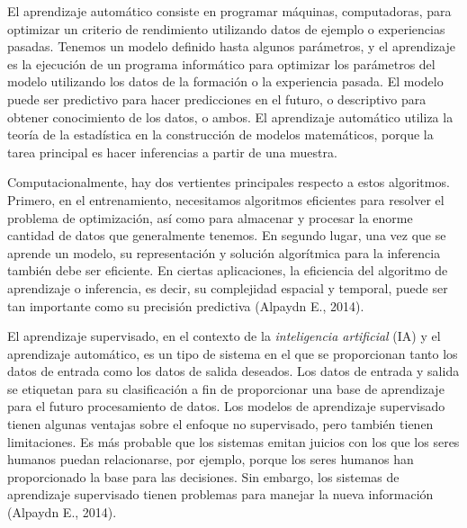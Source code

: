 El aprendizaje automático consiste en programar máquinas, computadoras, para optimizar un criterio de rendimiento utilizando datos de ejemplo o experiencias pasadas. Tenemos un modelo definido hasta algunos parámetros, y el aprendizaje es la ejecución de un programa informático para optimizar los parámetros del modelo utilizando los datos de la formación o la experiencia pasada. El modelo puede ser predictivo para hacer predicciones en el futuro, o descriptivo para obtener conocimiento de los datos, o ambos. El aprendizaje automático utiliza la teoría de la estadística en la construcción de modelos matemáticos, porque la tarea principal es hacer inferencias a partir de una muestra.  

Computacionalmente, hay dos vertientes principales respecto a estos algoritmos. Primero, en el entrenamiento, necesitamos algoritmos eficientes para resolver el problema de optimización, así como para almacenar y procesar la enorme cantidad de datos que generalmente tenemos. En segundo lugar, una vez que se aprende un modelo, su representación y solución algorítmica para la inferencia también debe ser eficiente. En ciertas aplicaciones, la eficiencia del algoritmo de aprendizaje o inferencia, es decir, su complejidad espacial y temporal, puede ser tan importante como su precisión predictiva (Alpaydn E., 2014).

El aprendizaje supervisado, en el contexto de la \textit{inteligencia artificial} (IA) y el aprendizaje automático, es un tipo de sistema en el que se proporcionan tanto los datos de entrada como los datos de salida deseados. Los datos de entrada y salida se etiquetan para su clasificación a fin de proporcionar una base de aprendizaje para el futuro procesamiento de datos. Los modelos de aprendizaje supervisado tienen algunas ventajas sobre el enfoque no supervisado, pero también tienen limitaciones. Es más probable que los sistemas emitan juicios con los que los seres humanos puedan relacionarse, por ejemplo, porque los seres humanos han proporcionado la base para las decisiones. Sin embargo, los sistemas de aprendizaje supervisado tienen problemas para manejar la nueva información (Alpaydn E., 2014). 

